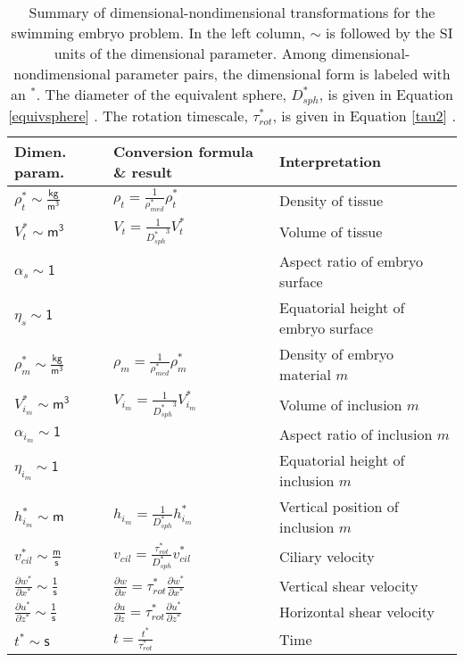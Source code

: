 \documentclass[10pt,a4paper]{article}
\def\p{\partial}
\begin{document}
\begin{table}[h]
	\centering
	\caption{Summary of dimensional-nondimensional transformations for the swimming embryo problem. In the left column, $\sim$ is followed by the SI units of the dimensional parameter. Among dimensional-nondimensional parameter pairs, the dimensional form is labeled with an $^*$. The diameter of the equivalent sphere, $D_{sph}^*$, is given in Equation \ref{equivsphere} . The rotation timescale, $\tau^*_{rot}$, is given in Equation \ref{tau2} .} \label{tab:d2nd}
	\vspace{.25cm}
	\small
	\begin{tabular}{|I|L|l|}
		\hline
		Dimen. param. & Conversion formula \& result & \hspace{1cm} Interpretation \\
		\hline
		$\rho_t^* \sim \mathsf{\frac{kg}{m^3}}$ & $\rho_t = \frac{1}{\rho_{med}^*} \rho_t^* $  & Density of tissue \\
		$V^*_t \sim \mathsf{m^3}$ & $V_t = \frac{1}{{D_{sph}^*}^3} V^*_t $  & Volume of tissue \\
		$\alpha_s \sim \mathsf{1}$ &    & Aspect ratio of embryo surface \\
		$\eta_s \sim \mathsf{1}$ &    & Equatorial height of embryo surface \\
		$\rho_m^* \sim \mathsf{\frac{kg}{m^3}}$ & $\rho_m = \frac{1}{\rho_{med}^*} \rho_m^* $  & Density of embryo material $m$ \\
		$V^*_{i_m} \sim \mathsf{m^3}$ & $V_{i_m} = \frac{1}{{D_{sph}^*}^3} V^*_{i_m} $  & Volume of inclusion $m$ \\
		$\alpha_{i_m} \sim \mathsf{1}$ &    & Aspect ratio of inclusion $m$ \\
		$\eta_{i_m} \sim \mathsf{1}$ &    & Equatorial height of inclusion $m$ \\
		$h^*_{i_m} \sim \mathsf{m}$ & $h_{i_m} = \frac{1}{{D_{sph}^*}} h^*_{i_m} $  & Vertical position of inclusion $m$ \\
		$v^*_{cil} \sim \mathsf{\frac{m}{s}}$ & $v_{cil} = \frac{{\tau^*_{rot}}}{D_{sph}^*}  v^*_{cil}  $  & Ciliary velocity \\
		\hline
		\vspace{0.1cm}
		$\frac{\p w^*}{\p x^*} \sim \mathsf{\frac{1}{s}}$ & $\frac{\p w}{\p x} = \tau^*_{rot} \frac{\p w^*}{\p x^*}  $  & Vertical shear velocity \\
		\vspace{0.1cm}
		$\frac{\p u^*}{\p z^*} \sim \mathsf{\frac{1}{s}}$ & $\frac{\p u}{\p z} = \tau^*_{rot} \frac{\p u^*}{\p z^*}  $  & Horizontal shear velocity \\
		\vspace{0.1cm}
		$t^* \sim \mathsf{s}$ & $t =  \frac{t^*}{\tau^*_{rot}}  $  & Time \\
		\hline
	\end{tabular}
\end{table}
\end{document}
